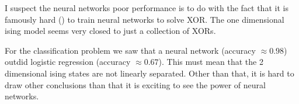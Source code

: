 \documentclass[parskip=half]{scrartcl}
\theoremstyle{definition}
\theoremstyle{remark}
\begin{document}
I suspect the neural networks poor performance is to do with the fact that it is famously hard (\cite{xor}) to train neural networks to solve XOR. 
The one dimensional ising model seems very closed to just a collection of XORs. 

For the classification problem we saw that a neural network (accuracy $\approx 0.98$) outdid logistic regression (accuracy $\approx 0.67$). 
This must mean that the 2 dimensional ising states are not linearly separated. 
Other than that, it is hard to draw other conclusions than that it is exciting to see the power of neural networks. 



\end{document}
